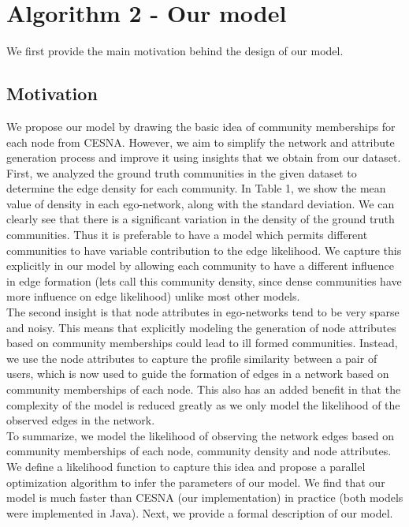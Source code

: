 \documentclass[11pt]{article}
\begin{document}
\section{Algorithm 2 - Our model}
We first provide the main motivation behind the design of our model.
\subsection{Motivation}
We propose our model by drawing the basic idea of community memberships for each node from CESNA. However, we aim to simplify the network and attribute generation process and improve it using insights that we obtain from our dataset. First, we analyzed the ground truth communities in the given dataset to determine the edge density for each community. In Table 1, we show the mean value of density in each ego-network, along with the standard deviation. We can clearly see that there is a significant variation in the density of the ground truth communities. Thus it is preferable to have a model which permits different communities to have variable contribution to the edge likelihood. We capture this explicitly in our model by allowing each community to have a different influence in edge formation (lets call this community density, since dense communities have more influence on edge likelihood) unlike most other models.  \\[3pt]

The second insight is that node attributes in ego-networks tend to be very sparse and noisy. This means that explicitly modeling the generation of node attributes based on community memberships could lead to ill formed communities. Instead, we use the node attributes to capture the profile similarity between a pair of users, which is now used to guide the formation of edges in a network based on community memberships of each node. This also has an added benefit in that the complexity of the model is reduced greatly as we only model the likelihood of the observed edges in the network. \\[3pt]
To summarize, we model the likelihood of observing the network edges based on community memberships of each node, community density and node attributes. We define a likelihood function to capture this idea and propose a parallel optimization algorithm to infer the parameters of our model. We find that our model is much faster than CESNA (our implementation) in practice (both models were implemented in Java).
Next, we provide a formal description of our model. 
\end{document}
